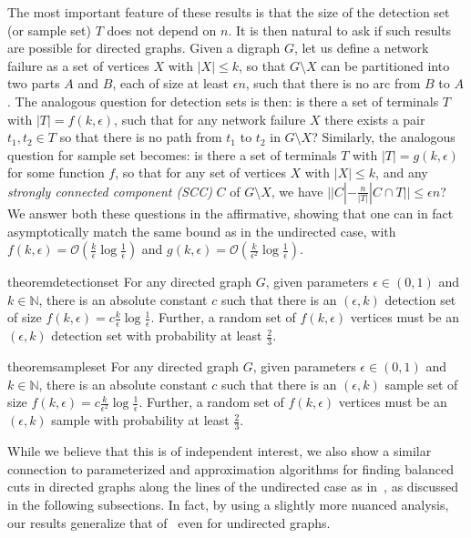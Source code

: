 \documentclass[11pt]{article}
\newcommand{\OO}{\mathcal{O}}
\begin{document}
The most important feature of these results is that the size of the detection set (or sample set) $T$ does not depend on $n$. It is then natural to ask if such results are possible for directed graphs. Given a digraph $G$, let us define a network failure as a set of vertices $X$ with $|X| \leq k$, so that $G \setminus X$ can be partitioned into two parts $A$ and $B$, each of size at least $\epsilon n$, such that there is no arc from $B$ to $A$. The analogous question for detection sets is then: is there a set of terminals $T$ with $|T| = f(k, \epsilon)$, such that for any network failure $X$ there exists a pair $t_1, t_2 \in T$ so that there is no path from $t_1$ to $t_2$ in $G \setminus X$? Similarly, the analogous question for sample set becomes: is there a set of terminals $T$ with $|T| = g(k, \epsilon)$ for some function $f$, so that for any set of vertices $X$ with $|X| \leq k$, and any \emph{strongly connected component (SCC)} $C$ of $G \setminus X$, we have $||C| - \frac{n}{|T|} |C \cap T|| \leq \epsilon n$? We answer both these questions in the affirmative, showing that one can in fact asymptotically match the same bound as in the undirected case, with $f(k, \epsilon) = \OO(\frac{k}{\epsilon} \log \frac{1}{\epsilon})$ and $g(k, \epsilon) = \OO(\frac{k}{\epsilon^2} \log \frac{1}{\epsilon})$.

\begin{restatable}{theorem}{detectionset}\label{thm:detection_set}
For any directed graph $G$, given parameters $\epsilon \in (0,1)$ and $k \in \mathbb{N}$, there is an absolute constant $c$ such that there is an $(\epsilon,k)$ detection set of size $f(k,\epsilon) = c\frac{k}{\epsilon} \log \frac{1}{\epsilon}$. Further, a random set of $f(k,\epsilon)$ vertices must be an $(\epsilon,k)$ detection set with probability at least $\frac{2}{3}$.
\end{restatable}

\begin{restatable}{theorem}{sampleset}\label{thm:sample_set}
For any directed graph $G$, given parameters $\epsilon \in (0,1)$ and $k \in \mathbb{N}$, there is an absolute constant $c$ such that there is an $(\epsilon,k)$ sample set of size $f(k,\epsilon) = c\frac{k}{\epsilon^2} \log \frac{1}{\epsilon}$. Further, a random set of $f(k,\epsilon)$ vertices must be an $(\epsilon,k)$ sample with probability at least $\frac{2}{3}$.
\end{restatable}


While we believe that this is of independent interest, we also show a similar connection to parameterized and approximation algorithms for finding balanced cuts in directed graphs along the lines of the undirected case as in~\cite{fm06}, as discussed in the following subsections. In fact, by using a slightly more nuanced analysis, our results generalize that of~\cite{fm06} even for undirected graphs. 
\end{document}
